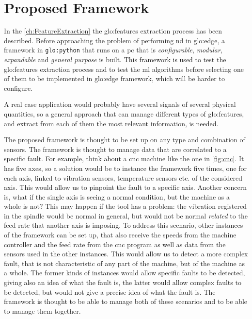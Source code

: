 \chapter{Proposed Framework}
\label{ch:Framework}

In the \autoref{ch:FeatureExtraction} the \gls{glo:feature}s extraction process has been described. Before approaching the problem of performing \gls{nd} in \gls{glo:edge}, a framework in \texttt{\gls{glo:python}} that runs on a \gls{pc} that is \emph{configurable}, \emph{modular}, \emph{expandable} and \emph{general purpose} is built. This framework is used to test the \gls{glo:feature}s extraction process and to test the \gls{ml} algorithms before selecting one of them to be implemented in \gls{glo:edge} framework, which will be harder to configure.

A real case application would probably have several signals of several physical quantities, so a general approach that can manage different types of \gls{glo:feature}s, and extract from each of them the most relevant information, is needed.

The proposed framework is thought to be set up on any type and combination of sensors. The framework is thought to manage data that are correlated to a specific fault. For example, think about a \gls{cnc} machine like the one in \autoref{fig:cnc}. It has five axes, so a solution would be to instance the framework five times, one for each axis, linked to vibration sensors, temperature sensors etc. of the considered axis. This would allow us to pinpoint the fault to a specific axis. Another concern is, what if the single axis is seeing a normal condition, but the machine as a whole is not? This may happen if the tool has a problem: the vibration registered in the spindle would be normal in general, but would not be normal \emph{related} to the feed rate that another axis is imposing. To address this scenario, other instances of the framework can be set up, that also receive the speeds from the machine controller and the feed rate from the \gls{cnc} program as well as data from the sensors used in the other instances. This would allow us to detect a more complex fault, that is not characteristic of any part of the machine, but of the machine as a whole. The former kinds of instances would allow specific faults to be detected, giving also an idea of what the fault is, the latter would allow complex faults to be detected, but would not give a precise idea of what the fault is. The framework is thought to be able to manage both of these scenarios and to be able to manage them together.

